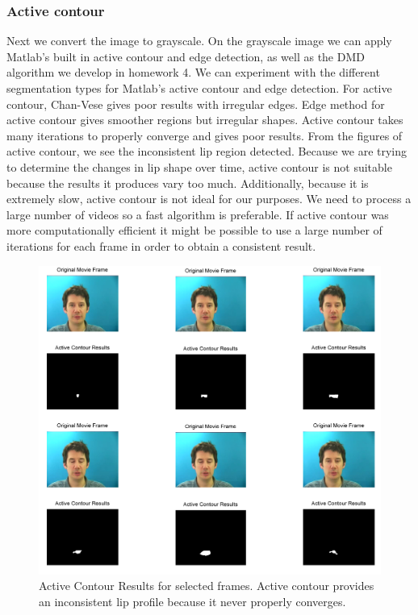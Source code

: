 \documentclass[a4paper,11pt]{article}
\begin{document}
\subsubsection{Active contour}
Next we convert the image to grayscale. On the grayscale image we can apply Matlab's built in active contour and edge detection, as well as the DMD algorithm we develop in homework 4. We can experiment with the different segmentation types for Matlab's active contour and edge detection. For active contour, Chan-Vese gives poor results with irregular edges. Edge method for active contour gives smoother regions but irregular shapes. Active contour takes many iterations to properly converge and gives poor results. From the figures of active contour, we see the inconsistent lip region detected. Because we are trying to determine the changes in lip shape over time, active contour is not suitable because the results it produces vary too much. Additionally, because it is extremely slow, active contour is not ideal for our purposes. We need to process a large number of videos so a fast algorithm is preferable. If active contour was more computationally efficient it might be possible to use a large number of iterations for each frame in order to obtain a consistent result.  \par
\begin{figure}[!ht]
	\includegraphics[width=1\textwidth, height=0.75\textwidth]{AC1.png}
	\caption{Active Contour Results for selected frames. Active contour provides an inconsistent lip profile because it never properly converges.}
\end{figure}
\end{document}
